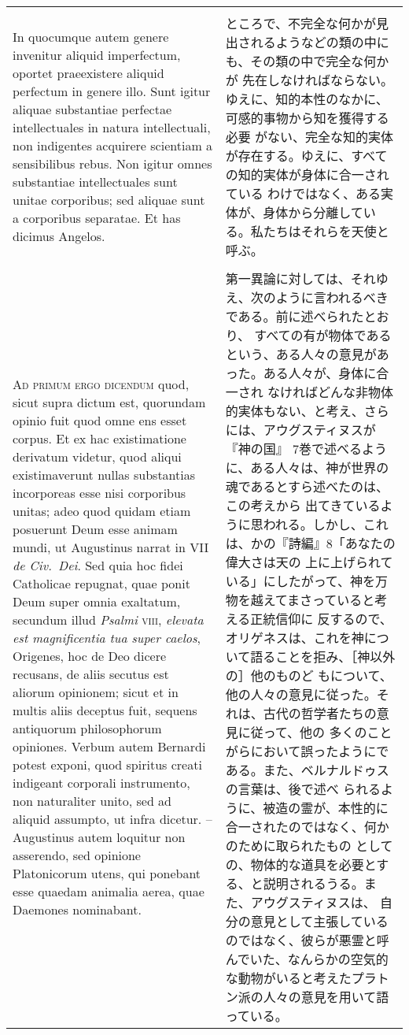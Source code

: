 \documentclass[10pt]{jsarticle} %
\begin{document}
\begin{longtable}{p{21em}p{21em}}
\\\\



In quocumque autem genere invenitur aliquid imperfectum, oportet praeexistere
aliquid perfectum in genere illo. Sunt igitur aliquae substantiae perfectae
intellectuales in natura intellectuali, non indigentes acquirere scientiam a
sensibilibus rebus. Non igitur omnes substantiae intellectuales sunt unitae
corporibus; sed aliquae sunt a corporibus separatae. Et has dicimus Angelos.


&

ところで、不完全な何かが見出されるようなどの類の中にも、その類の中で完全な何かが
先在しなければならない。ゆえに、知的本性のなかに、可感的事物から知を獲得する必要
がない、完全な知的実体が存在する。ゆえに、すべての知的実体が身体に合一されている
わけではなく、ある実体が、身体から分離している。私たちはそれらを天使と呼ぶ。

\\\\


{\scshape Ad primum ergo dicendum} quod, sicut supra dictum est, quorundam
opinio fuit quod omne ens esset corpus. Et ex hac existimatione derivatum
videtur, quod aliqui existimaverunt nullas substantias incorporeas esse nisi
corporibus unitas; adeo quod quidam etiam posuerunt Deum esse animam mundi, ut
Augustinus narrat in VII {\itshape de Civ.~Dei}. Sed quia hoc fidei Catholicae
repugnat, quae ponit Deum super omnia exaltatum, secundum illud {\itshape
Psalmi} {\scshape viii}, {\itshape elevata est magnificentia tua super caelos},
Origenes, hoc de Deo dicere recusans, de aliis secutus est aliorum opinionem;
sicut et in multis aliis deceptus fuit, sequens antiquorum philosophorum
opiniones. Verbum autem Bernardi potest exponi, quod spiritus creati indigeant
corporali instrumento, non naturaliter unito, sed ad aliquid assumpto, ut infra
dicetur. -- Augustinus autem loquitur non asserendo, sed opinione Platonicorum
utens, qui ponebant esse quaedam animalia aerea, quae Daemones nominabant.

&

第一異論に対しては、それゆえ、次のように言われるべきである。前に述べられたとおり、
すべての有が物体であるという、ある人々の意見があった。ある人々が、身体に合一され
なければどんな非物体的実体もない、と考え、さらには、アウグスティヌスが『神の国』
7巻で述べるように、ある人々は、神が世界の魂であるとすら述べたのは、この考えから
出てきているように思われる。しかし、これは、かの『詩編』8「あなたの偉大さは天の
上に上げられている」にしたがって、神を万物を越えてまさっていると考える正統信仰に
反するので、オリゲネスは、これを神について語ることを拒み、［神以外の］他のものど
もについて、他の人々の意見に従った。それは、古代の哲学者たちの意見に従って、他の
多くのことがらにおいて誤ったようにである。また、ベルナルドゥスの言葉は、後で述べ
られるように、被造の霊が、本性的に合一されたのではなく、何かのために取られたもの
としての、物体的な道具を必要とする、と説明されるうる。また、アウグスティヌスは、
自分の意見として主張しているのではなく、彼らが悪霊と呼んでいた、なんらかの空気的
な動物がいると考えたプラトン派の人々の意見を用いて語っている。


\end{longtable}
\end{document}
